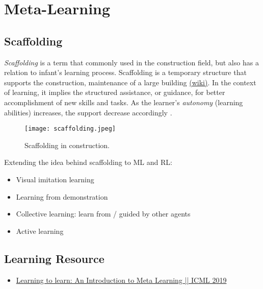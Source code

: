 \chapter{Meta-Learning}

\section{Scaffolding}
\textit{Scaffolding} is a term that commonly used in the construction field, but also has a relation to infant's learning process. Scaffolding is a temporary structure that supports the construction, maintenance of a large building \href{https://en.wikipedia.org/wiki/Scaffolding}{(wiki)}. In the context of learning, it implies the structured assistance, or guidance, for better accomplishment of new skills and tasks. As the learner's \textit{autonomy} (learning abilities) increases, the support decrease accordingly . \cite{parentlab2019ccaffolding, zaadnoordijk2020next}

\begin{figure}[hbt!]
	\centering
	\texttt{[image: scaffolding.jpeg]}
	\caption{Scaffolding in construction.}
\end{figure}

Extending the idea behind scaffolding to \ac{ML} and \ac{RL}: \cite{zaadnoordijk2020next}
\begin{itemize}
	\item Visual imitation learning \cite{finn2017one, sharma2019third}
	\item Learning from demonstration \todo{}
	\item Collective learning: learn from / guided by other agents
	\item Active learning
\end{itemize}




\section{Learning Resource}
\begin{itemize}
	\item \href{https://youtu.be/ByeRnmHJ-uk}{Learning to learn: An Introduction to Meta Learning || \ac{ICML} 2019}
\end{itemize}

